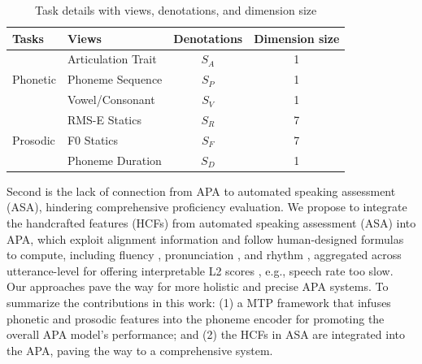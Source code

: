 \documentclass[conference,a4paper]{APSIPA2025}
\begin{document}
\begin{table}[t!]
    \centering
    \caption{Task details with views, denotations, and dimension size}
    \label{tab:task_details}
    \begin{tabular}{llcc}
    \hline
    \textbf{Tasks}   & \textbf{Views}                       & \textbf{Denotations} & \textbf{Dimension size} \\ \hline
    \multirow{3}{*}{Phonetic} 
                     & Articulation Trait                   & $S_{A}$             & 1                       \\ \cline{2-4} 
                     & Phoneme Sequence                       & $S_P$                & 1                       \\ \cline{2-4} 
                     & Vowel/Consonant                      & $S_V$                & 1                       \\ \hline  
    \multirow{3}{*}{Prosodic} 
                     & RMS-E Statics                               & $S_{R}$          & 7                       \\ \cline{2-4} 
                     & F0 Statics                                  & $S_{F}$             & 7                       \\ \cline{2-4} 
                     & Phoneme Duration                       & $S_{D}$             & 1                       \\ \hline
    \end{tabular}
\vspace{-0.5cm}
\end{table}

Second is the lack of connection from APA to automated speaking assessment (ASA), hindering comprehensive proficiency evaluation. We propose to integrate the handcrafted features (HCFs) from automated speaking assessment (ASA) into APA, which exploit alignment information and follow human-designed formulas to compute, including fluency \cite{strik1999automatic, preciado2018speaker}, pronunciation \cite{10.1007/978-3-030-50729-9_48, 5700836}, and rhythm \cite{kyriakopoulos19_interspeech}, aggregated across utterance-level for offering interpretable L2 scores \cite{7820782, zechner2019automated}, e.g., speech rate too slow. Our approaches pave the way for more holistic and precise APA systems. To summarize the contributions in this work: (1) a MTP framework that infuses phonetic and prosodic features into the phoneme encoder for promoting the overall APA model's performance; and (2) the HCFs in ASA are integrated into the APA, paving the way to a comprehensive system.
\end{document}
